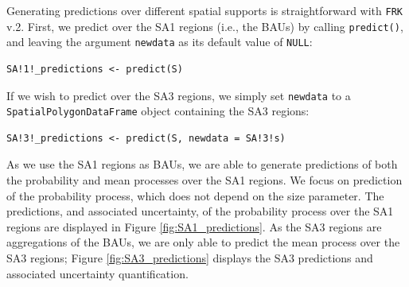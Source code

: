\documentclass[12pt,a4paper]{article}
\begin{document}



Generating predictions over different spatial supports is straightforward with \texttt{FRK} v.2.
First, we predict over the SA1 regions  (i.e., the BAUs) by calling \texttt{predict()}, and leaving the argument \texttt{newdata} as its default value of \texttt{NULL}:

\begin{minipage}{\linewidth}
\begin{lstlisting}[style=R]
SA!1!_predictions <- predict(S)
\end{lstlisting}
\end{minipage}

If we wish to predict over the SA3 regions, we simply set \texttt{newdata} to a  \texttt{SpatialPolygonDataFrame} object containing the SA3 regions:

\begin{minipage}{\linewidth}
\begin{lstlisting}[style=R]
SA!3!_predictions <- predict(S, newdata = SA!3!s)
\end{lstlisting}
\end{minipage}



As we use the SA1 regions as BAUs, we are able to generate predictions of both the probability and mean processes over the SA1 regions.
We focus on prediction of the probability process, which does not depend on the size parameter. 
The predictions, and associated uncertainty, of the probability process over the SA1 regions are displayed in Figure \ref{fig:SA1_predictions}.
As the SA3 regions are aggregations of the BAUs, we are only able to predict the mean process over the SA3 regions; Figure \ref{fig:SA3_predictions} displays the SA3 predictions and associated uncertainty quantification. 
\end{document}
